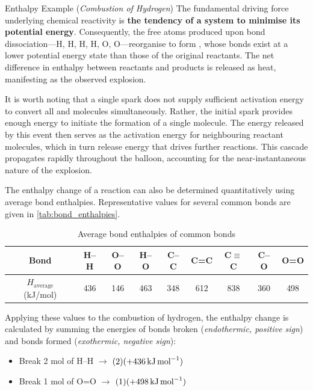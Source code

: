 \documentclass[10pt]{article}
\begin{document}
\begin{core}{Enthalpy Example (\textit{Combustion of Hydrogen})}
      The fundamental driving force underlying chemical reactivity is \textbf{the tendency of a system to minimise its potential energy}. Consequently, the free atoms produced upon bond dissociation---H, H, H, H, O, O---reorganise to form , whose bonds exist at a lower potential energy state than those of the original reactants. The net difference in enthalpy between reactants and products is released as heat, manifesting as the observed explosion.

      It is worth noting that a single spark does not supply sufficient activation energy to convert all  and  molecules simultaneously. Rather, the initial spark provides enough energy to initiate the formation of a single  molecule. The energy released by this event then serves as the activation energy for neighbouring reactant molecules, which in turn release energy that drives further reactions. This cascade propagates rapidly throughout the balloon, accounting for the near-instantaneous nature of the explosion.

      The enthalpy change of a reaction can also be determined quantitatively using average bond enthalpies. Representative values for several common bonds are given in \autoref{tab:bond_enthalpies}.

      \begin{table}[H]
        \centering
        \begin{tabular}{c|c|c|c|c|c|c|c|c}
          Bond & H--H & O--O & H--O & C--C & C=C & C$\equiv$C & C--O & O=O\\
          \hline
          $H_{\text{average}}$ (kJ/mol) & 436 & 146 & 463 & 348 & 612 & 838 & 360 & 498\\
        \end{tabular}
        \caption{Average bond enthalpies of common bonds}
        \label{tab:bond_enthalpies}
      \end{table}

      Applying these values to the combustion of hydrogen, the enthalpy change is calculated by summing the energies of bonds broken (\textit{endothermic, positive sign}) and bonds formed (\textit{exothermic, negative sign}):

      \begin{itemize}

        \item Break 2 mol of H--H $\rightarrow$ $(2)(+436\,\text{kJ\,mol}^{-1})$

        \item Break 1 mol of O=O $\rightarrow$ $(1)(+498\,\text{kJ\,mol}^{-1})$


\end{itemize}
\end{core}
\end{document}
